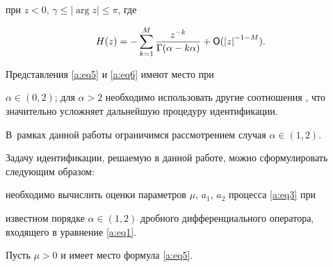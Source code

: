 при $z<0$, $\gamma \leq | \arg z|\leq \pi$, где  

$$H(z)=-\sum\limits_{k=1}^{M} \frac{{z}^{-k}}{\Gamma(\alpha-k\alpha)}+{\sf O}({|z|}^{-1-M}).$$













Представления \eqref{a:eq5} и \eqref{a:eq6} имеют место при

$\alpha \in (0, 2)$; для  $\alpha> 2$ необходимо использовать другие соотношения \cite{v:GM}, что значительно усложняет дальнейшую процедуру идентификации. 

В~рамках данной работы ограничимся рассмотрением случая $\alpha \in (1, 2)$.



Задачу идентификации, решаемую в данной работе, можно сформулировать следующим образом: 

необходимо вычислить оценки параметров $\mu$, $a_1$, $a_2$ процесса \eqref{a:eq3} при

известном порядке $\alpha\in (1, 2)$ дробного дифференциального оператора, входящего в уравнение \eqref{a:eq1}.



\smallskip





 Пусть $\mu> 0$ и имеет место формула \eqref{a:eq5}. 

